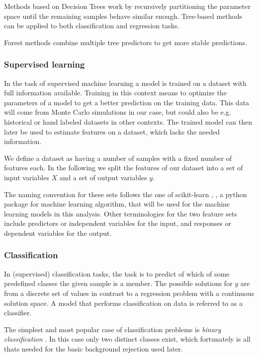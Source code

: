 Methods based on Decision Trees work by recursively partitioning
the parameter space until the remaining samples behave similar enough.
Tree-based methods can be applied to both classification and regression tasks.

Forest methods combine multiple tree predictors to get more stable
predictions.

\subsubsection{Supervised learning}
In the task of supervised machine learning a model is trained on a
dataset with full information available.
Training in this context means to optimize the parameters of a 
model to get a better prediction on the training data.
This data will come from Monte Carlo simulations in our case, but
could also be e.g. historical or hand labeled datasets in other contexts.
The trained model can then later be used to estimate features on a dataset, which
lacks the needed information.

We define a dataset as having a number of samples with a fixed number of
features each. In the following we split
the features of our dataset into a set of input variables $X$ and
a set of output variables $y$.

The naming convention for
these sets follows the one of scikit-learn
\cite{scikit-learn}, \cite{sklearn_api}, a python package for
machine learning algorithm, that will be used for the
machine learning models in this analysis.
Other terminologies for the two feature sets include
predictors or independent variables for the input, and
responses or dependent variables for the output.

\subsubsection{Classification}
In (supervised) classification tasks, the task is to predict of which of some
predefined classes the given sample is a member. The possible solutions for $y$
are from a discrete set of values in
contrast to a regression problem with a continuous solution space.
A model that performs classification on data is referred to as a
classifier.

The simplest and most popular case of classification problems
is \textit{binary classification} \cite{sokolova2009systematic}.
In this case only two distinct
classes exist, which fortunately is all thats needed for
the basic background rejection used later.

